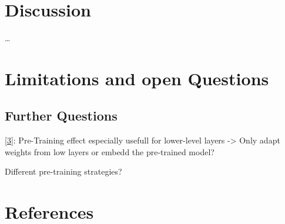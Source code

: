 \documentclass[
  11pt,
]{article}
\begin{document}
\hypertarget{discussion}{%
\section{Discussion}\label{discussion}}

\ldots{}

\hypertarget{limitations-and-open-questions}{%
\section{Limitations and open Questions}\label{limitations-and-open-questions}}

\hypertarget{further-questions}{%
\subsection{Further Questions}\label{further-questions}}

{[}\protect\hyperlink{ref-pmlr-v5-erhan09a}{3}{]}: Pre-Training effect especially usefull for lower-level layers -\textgreater{} Only adapt weights from low layers or embedd the pre-trained model?

Different pre-training strategies?

\newpage

\hypertarget{I}{%
\section*{References}\label{I}}
\end{document}
